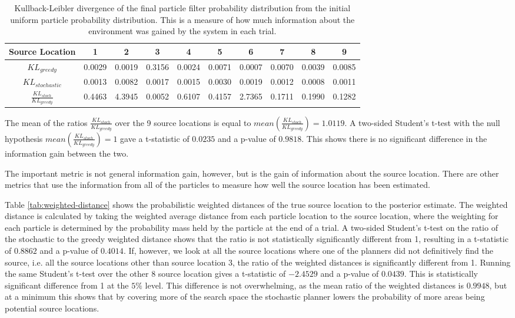 \documentclass[submit]{aiaa-pretty-modified}
\begin{document}
\begin{table}[htb]
\begin{center}
\begin{tabular}{|c||c||c||c||c||c||c||c||c||c|}
\hline
 Source Location & 1 & 2 & 3 & 4 & 5 & 6 & 7 & 8 & 9 \\
\hline \hline
$KL_{greedy}$  & 0.0029 & 0.0019 & 0.3156 & 0.0024 & 0.0071 & 0.0007 & 0.0070 & 0.0039 & 0.0085 \\
\hline
$KL_{stochastic}$ & 0.0013 & 0.0082 & 0.0017 & 0.0015 & 0.0030 & 0.0019 & 0.0012 & 0.0008 & 0.0011 \\
\hline
$\frac{KL_{stoch}}{KL_{greedy}}$ & 0.4463 & 4.3945 & 0.0052 & 0.6107 & 0.4157 & 2.7365 & 0.1711 & 0.1990 & 0.1282 \\
\hline
\end{tabular}
\caption{Kullback-Leibler divergence of the final particle filter
  probability distribution from the initial uniform particle
  probability distribution.  This is a measure of how much
  information about the environment was gained by the system in each trial. }
\label{tab:allinfo}
\end{center}
\end{table}

The mean of the ratios $\frac{KL_{stoch}}{KL_{greedy}}$ over the 9
source locations is equal to $mean(\frac{KL_{stoch}}{KL_{greedy}}) =
1.0119$.  A two-sided Student's t-test with the null hypothesis
$mean(\frac{KL_{stoch}}{KL_{greedy}}) = 1$ gave a t-statistic of
$0.0235$ and a p-value of $0.9818$.  This shows there is no significant
difference in the information gain between the two.

The important metric is not general information gain, however, but is the gain
of information about the source location. There are other metrics that use the
information from all of the particles to measure how well the source location
has been estimated. 

Table \ref{tab:weighted-distance} shows the probabilistic weighted distances
of the true source location to the posterior estimate.  The weighted distance is
calculated by taking the weighted average distance from each particle location
to the source location, where the weighting for each particle is determined by the
probability mass held by the particle at the end of a trial.  A two-sided
Student's t-test on the ratio of the stochastic to the greedy weighted distance
shows that the ratio is not statistically significantly different from 1,
resulting in a t-statistic of $0.8862$ and a p-value of $0.4014$. If, however,
we look at all the source locations where one of the planners did not
definitively find the source, i.e. all the source locations other than source
location 3, the ratio of the weighted distances is significantly different from
1. Running the same Student's t-test over the other 8 source location gives a
t-statistic of $-2.4529$ and a p-value of $0.0439$. This is statistically
significant difference from 1 at the $5\%$ level. This difference is not
overwhelming, as the mean ratio of the weighted distances is $0.9948$, but at a
minimum this shows that by covering more of the search space the stochastic planner
lowers the probability of more areas being potential source locations.
\end{document}
